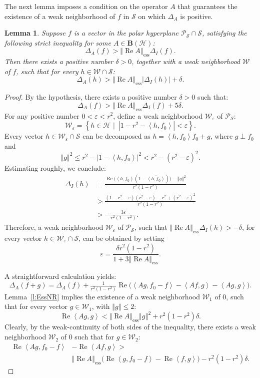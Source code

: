 \documentclass{tran-l}
\newtheorem{lem}[thm]{Lemma}
\theoremstyle{definition}
\theoremstyle{remark}
\numberwithin{equation}{subsection}
\DeclareMathOperator{\RE}{Re}
\DeclareMathOperator{\ess}{ess}
\newcommand{\eps}{\varepsilon}
\newcommand{\h}{\mathcal{H}}
\newcommand{\s}{\mathcal{S}}
\newcommand{\W}{\mathcal{W}}
\newcommand{\BH}{\mathbf{B}(\mathcal{H})}
\newcommand{\Polar}{\mathcal{P}_{\s}}
\newcommand{\abs}[1]{\left\vert#1\right\vert}
\newcommand{\set}[1]{\left\{#1\right\}}
\newcommand{\seq}[1]{\left<#1\right>}
\newcommand{\norm}[1]{\left\Vert#1\right\Vert}
\newcommand{\essnorm}[1]{\norm{#1}_{\ess}}
\begin{document}
The next lemma imposes a condition on the operator $A$ that guarantees the existence of a weak neighborhood of $f$ in $\s$ on which $\Delta_A$ is positive.

\begin{lem} \label{l:ESS}
Suppose $f$ is a vector in the polar hyperplane $\Polar\cap\s$, satisfying the following \emph{strict} inequality for some $A \in \BH$:
\[ \Delta_A(f) > \essnorm{\RE{A}} \Delta_I(f). \]
Then there exists a positive number $\delta>0$, together with a weak neighborhood $\W$ of $f$, such that for every $h\in\W\cap\s$:
\[ \Delta_A(h) > \essnorm{\RE{A}}\abs{\Delta_I(h)} + \delta. \]
\end{lem}

\begin{proof}
By the hypothesis, there exists a positive number $\delta>0$ such that:
\begin{equation}\label{e:EC1}
  \Delta_A(f) > \essnorm{\RE{A}}\Delta_I(f) + 5\delta.
\end{equation}
For any positive number $0<\eps<r^2$, define a weak neighborhood $\W_\eps$ of $\Polar$:
\[ \W_\eps = \set{h\in\h\,\,|\,\,\,\abs{1-r^2-\seq{h,f_0}} < \eps}. \]
Every vector $h\in\W_\eps\cap\s$ can be decomposed as $h=\seq{h,f_0}f_0+g$, where $g \perp f_0$ and
\[ \norm{g}^2 \leq r^2 - \abs{1-\seq{h,f_0}}^2 < r^2 - (r^2 -\eps)^2. \]
Estimating roughly, we conclude:
\begin{align*}
  \Delta_I(h) &=
    \frac{\RE\big(\seq{h,f_0}(1-\overline{\seq{h,f_0}})\big)
      -\norm{g}^2}{r^2(1-r^2)}\\
    &> \frac{(1-r^2-\eps)(r^2-\eps)-r^2+(r^2-\eps)^2}{r^2(1-r^2)} \\
    &> -\frac{3\eps}{r^2(1-r^2)}.
\end{align*}
Therefore, a weak neighborhood $\W_\eps$ of $\Polar$, such that $\essnorm{\RE{A}} \Delta_I(h) > -\delta$, for every vector $h\in\W_\eps\cap\s$, can be obtained by setting
\[ \eps=\frac{\delta{r^2}(1-r^2)}{1+3\essnorm{\RE{A}}}. \]

A straightforward calculation yields:
\begin{equation}\label{e:EC2}
  \Delta_A(f+g) = \Delta_A(f) + \tfrac{1}{r^2(1-r^2)}
  \RE\big(\seq{A{g},f_0-f} - \seq{A{f},g} - \seq{A{g},g} \big).
\end{equation}
Lemma~\ref{l:EssNR} implies the existence of a weak neighborhood $\W_1$ of $0$, such that for every vector $g\in\W_1$, with $\norm{g}\leq2$:
\begin{equation}\label{e:EC3}
  \RE\seq{A g,g} < \essnorm{\RE{A}} \norm{g}^2 + r^2(1-r^2)\delta.
\end{equation}
Clearly, by the weak-continuity of both sides of the inequality, there exists a weak neighborhood $\W_2$ of $0$ such that for $g\in\W_2$:
\begin{equation}\label{e:EC4}
  \begin{split}
    \RE\seq{A g,f_0-f} & - \RE\seq{A f,g} > \\ &
    \essnorm{\RE{A}}\big(\RE\seq{g,f_0-f}-\RE\seq{f,g}\big)
      -r^2(1-r^2)\delta.
  \end{split}
\end{equation}


\end{proof}
\end{document}

